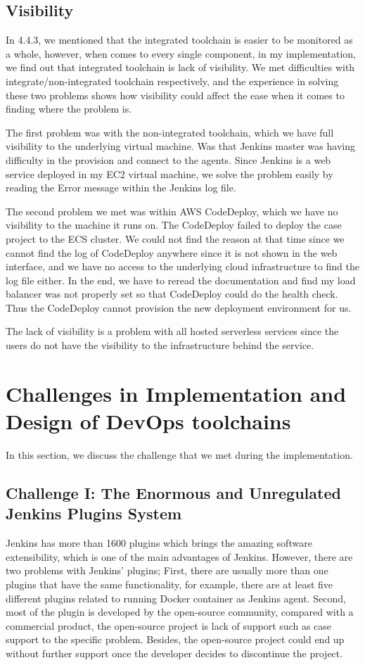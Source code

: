 \subsection{Visibility}
\label{visibility}
In 4.4.3, we mentioned that the integrated toolchain is easier to be monitored as a whole, however, when comes to every single component, in my implementation, we find out that integrated toolchain is lack of visibility. We met difficulties with integrate/non-integrated toolchain respectively, and the experience in solving these two problems shows how visibility could affect the ease when it comes to finding where the problem is.
\par
The first problem was with the non-integrated toolchain, which we have full visibility to the underlying virtual machine. Was that Jenkins master was having difficulty in the provision and connect to the agents. Since Jenkins is a web service deployed in my EC2 virtual machine, we solve the problem easily by reading the Error message within the Jenkins log file.
\par
The second problem we met was within AWS CodeDeploy, which we have no visibility to the machine it runs on. The CodeDeploy failed to deploy the case project to the ECS cluster. We could not find the reason at that time since we cannot find the log of CodeDeploy anywhere since it is not shown in the web interface, and we have no access to the underlying cloud infrastructure to find the log file either. In the end, we have to reread the documentation and find my load balancer was not properly set so that CodeDeploy could do the health check. Thus the CodeDeploy cannot provision the new deployment environment for us.
\par
The lack of visibility is a problem with all hosted serverless services since the users do not have the visibility to the infrastructure behind the service.
\section{Challenges in Implementation and Design of DevOps toolchains}
In this section, we discuss the challenge that we met during the implementation. 
\subsection{Challenge I: The Enormous and Unregulated Jenkins Plugins System}
Jenkins has more than 1600 plugins which brings the amazing software extensibility, which is one of the main advantages of Jenkins. However, there are two problems with Jenkins' plugins; First, there are usually more than one plugins that have the same functionality, for example, there are at least five different plugins related to running Docker container as Jenkins agent. Second, most of the plugin is developed by the open-source community, compared with a commercial product, the open-source project is lack of support such as case support to the specific problem. Besides, the open-source project could end up without further support once the developer decides to discontinue the project.

